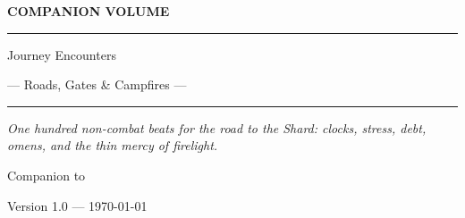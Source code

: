 \begin{titlepage}
  \thispagestyle{empty}
  \centering
  \vspace*{1.8cm}

  {\GameSans\footnotesize\bfseries\color{ash} COMPANION VOLUME\par}
  \vspace{0.6cm}
  {\color{blood}\rule{0.55\textwidth}{0.6pt}\par}
  \vspace{0.8cm}

  \shardmark[2.4cm]

  \vspace{0.9cm}

  {\TitleFont\Huge\color{shardink} Journey Encounters \par}

  \vspace{0.45cm}
  {\TitleFont\large\color{blood} --- Roads, Gates \& Campfires ---\par}

  \vspace{0.55cm}
  {\color{blood}\rule{0.55\textwidth}{0.6pt}\par}

  \vspace{1.4cm}

  \begin{minipage}{0.72\textwidth}
    \centering
    \itshape\color{shardink}
    One hundred non-combat beats for the road to the Shard:
    clocks, stress, debt, omens, and the thin mercy of firelight.
  \end{minipage}

  \vfill

  {\GameSans\small\color{ash} Companion to \game{} \par}
  \vspace{0.35cm}
  {\GameSans\small\color{ash} Version 1.0 --- \today \par}
\end{titlepage}
